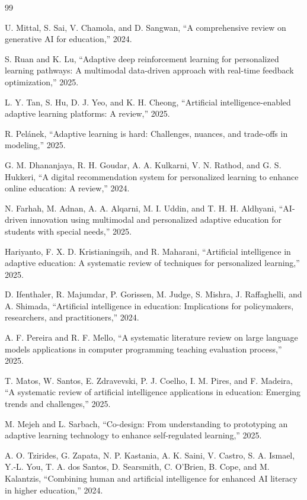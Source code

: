 \documentclass[conference]{IEEEtran}
\begin{document}
\begin{thebibliography}{99}

U. Mittal, S. Sai, V. Chamola, and D. Sangwan,
``A comprehensive review on generative AI for education,'' 2024.

S. Ruan and K. Lu,
``Adaptive deep reinforcement learning for personalized learning pathways:
A multimodal data-driven approach with real-time feedback optimization,''
2025.

L. Y. Tan, S. Hu, D. J. Yeo, and K. H. Cheong,
``Artificial intelligence-enabled adaptive learning platforms: A review,''
2025.

R. Pelánek,
``Adaptive learning is hard: Challenges, nuances, and trade-offs in modeling,''
2025.

G. M. Dhananjaya, R. H. Goudar, A. A. Kulkarni, V. N. Rathod,
and G. S. Hukkeri,
``A digital recommendation system for personalized learning to enhance
online education: A review,'' 2024.

N. Farhah, M. Adnan, A. A. Alqarni, M. I. Uddin,
and T. H. H. Aldhyani,
``AI-driven innovation using multimodal and personalized adaptive education
for students with special needs,'' 2025.

Hariyanto, F. X. D. Kristianingsih, and R. Maharani,
``Artificial intelligence in adaptive education: A systematic review of
techniques for personalized learning,'' 2025.

D. Ifenthaler, R. Majumdar, P. Gorissen, M. Judge, S. Mishra,
J. Raffaghelli, and A. Shimada,
``Artificial intelligence in education: Implications for policymakers,
researchers, and practitioners,'' 2024.

A. F. Pereira and R. F. Mello,
``A systematic literature review on large language models applications in
computer programming teaching evaluation process,'' 2025.

T. Matos, W. Santos, E. Zdravevski, P. J. Coelho, I. M. Pires,
and F. Madeira,
``A systematic review of artificial intelligence applications in education:
Emerging trends and challenges,'' 2025.

M. Mejeh and L. Sarbach,
``Co-design: From understanding to prototyping an adaptive learning
technology to enhance self-regulated learning,'' 2025.

A. O. Tzirides, G. Zapata, N. P. Kastania, A. K. Saini, V. Castro,
S. A. Ismael, Y.-L. You, T. A. dos Santos, D. Searsmith,
C. O'Brien, B. Cope, and M. Kalantzis,
``Combining human and artificial intelligence for enhanced AI literacy
in higher education,'' 2024.


\end{thebibliography}
\end{document}
